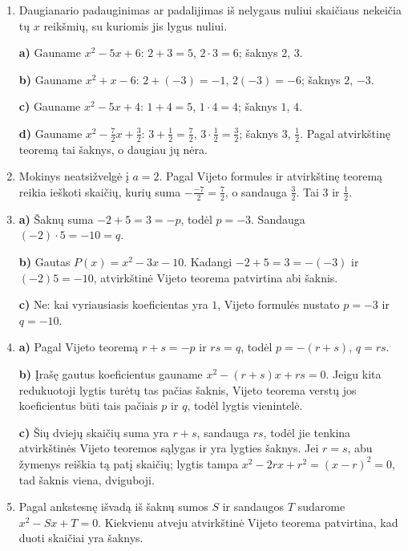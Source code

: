 \documentclass[12pt,a4paper]{article}
\begin{document}
\begin{enumerate}
\textbf{c)} $4+(-3)=1$, $4(-3)=-12$: šaknys $4$, $-3$.

\textbf{d)} $3+(-5)=-2$, $3(-5)=-15$: šaknys $3$, $-5$.

\textbf{e)} $3+3=6$, $3\cdot3=9$: vienintelė šaknis $3$. Pagal šaknų formulę $D=36-36=0$.

\textbf{f)} $0+5=5$, $0\cdot5=0$: šaknys $0$, $5$. Kiekvienu atveju abi lygybės pagrindžia šaknis pagal atvirkštinę teoremą. Kadangi kvadratinis daugianaris turi ne daugiau kaip dvi skirtingas realiąsias šaknis, kitų šaknų nėra.
\item Daugianario padauginimas ar padalijimas iš nelygaus nuliui skaičiaus nekeičia tų $x$ reikšmių, su kuriomis jis lygus nuliui.

\textbf{a)} Gauname $x^2-5x+6$: $2+3=5$, $2\cdot3=6$; šaknys $2$, $3$.

\textbf{b)} Gauname $x^2+x-6$: $2+(-3)=-1$, $2(-3)=-6$; šaknys $2$, $-3$.

\textbf{c)} Gauname $x^2-5x+4$: $1+4=5$, $1\cdot4=4$; šaknys $1$, $4$.

\textbf{d)} Gauname $x^2-\frac{7}{2}x+\frac{3}{2}$: $3+\frac{1}{2}=\frac{7}{2}$, $3\cdot\frac{1}{2}=\frac{3}{2}$; šaknys $3$, $\frac{1}{2}$. Pagal atvirkštinę teoremą tai šaknys, o daugiau jų nėra.
\item Mokinys neatsižvelgė į $a=2$. Pagal Vijeto formules ir atvirkštinę teoremą reikia ieškoti skaičių, kurių suma $-\frac{-7}{2}=\frac{7}{2}$, o sandauga $\frac{3}{2}$. Tai $3$ ir $\frac{1}{2}$.
\item \textbf{a)} Šaknų suma $-2+5=3=-p$, todėl $p=-3$. Sandauga $(-2)\cdot5=-10=q$.

\textbf{b)} Gautas $P(x)=x^2-3x-10$. Kadangi $-2+5=3=-(-3)$ ir $(-2)5=-10$, atvirkštinė Vijeto teorema patvirtina abi šaknis.

\textbf{c)} Ne: kai vyriausiasis koeficientas yra $1$, Vijeto formulės nustato $p=-3$ ir $q=-10$.
\item \textbf{a)} Pagal Vijeto teoremą $r+s=-p$ ir $rs=q$, todėl $p=-(r+s)$, $q=rs$.

\textbf{b)} Įrašę gautus koeficientus gauname $x^2-(r+s)x+rs=0$. Jeigu kita redukuotoji lygtis turėtų tas pačias šaknis, Vijeto teorema verstų jos koeficientus būti tais pačiais $p$ ir $q$, todėl lygtis vienintelė.

\textbf{c)} Šių dviejų skaičių suma yra $r+s$, sandauga $rs$, todėl jie tenkina atvirkštinės Vijeto teoremos sąlygas ir yra lygties šaknys. Jei $r=s$, abu žymenys reiškia tą patį skaičių; lygtis tampa $x^2-2rx+r^2=(x-r)^2=0$, tad šaknis viena, dviguboji.
\item Pagal ankstesnę išvadą iš šaknų sumos $S$ ir sandaugos $T$ sudarome $x^2-Sx+T=0$. Kiekvienu atveju atvirkštinė Vijeto teorema patvirtina, kad duoti skaičiai yra šaknys.


\end{enumerate}
\end{document}
